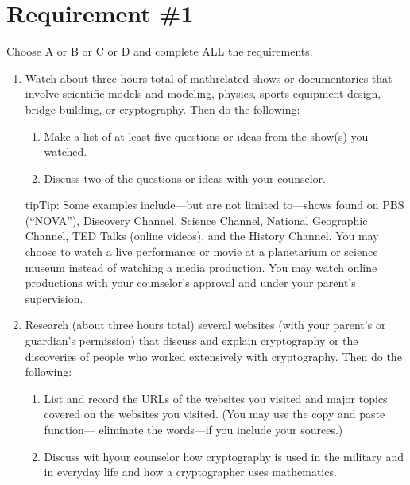 \documentclass[letterpaper,10pt,english]{sphinxmanual}
\begin{document}
\chapter{Requirement \#1}
\label{\detokenize{requirement1:requirement-1}}\label{\detokenize{requirement1::doc}}
Choose A or B or C or D and complete ALL the requirements.
\begin{enumerate}
%
\item {} 
Watch about three hours total of math\sphinxhyphen{}related shows or documentaries that involve scientific models and modeling, physics, sports equipment design, bridge building, or cryptography. Then do the following:
\begin{enumerate}
%
\item {} 
Make a list of at least five questions or ideas from the show(s) you watched.

\item {} 
Discuss two of the questions or ideas with your counselor.

\end{enumerate}

\begin{sphinxadmonition}{tip}{Tip:}
Some examples include—but are not limited to—shows found on PBS (“NOVA”), Discovery Channel, Science Channel, National Geographic Channel, TED Talks (online videos), and the History Channel. You may choose to watch a live performance or movie at a planetarium or science museum instead of watching a media production. You may watch online productions with your counselor’s approval and under your parent’s supervision.
\end{sphinxadmonition}

\item {} 
Research (about three hours total) several websites (with your parent’s or guardian’s permission) that discuss and explain cryptography or the discoveries of people who worked extensively with cryptography. Then do the following:
\begin{enumerate}
%
\item {} 
List and record the URLs of the websites you visited and major topics covered on the websites you visited. (You may use the copy and paste function— eliminate the words—if you include your sources.)

\item {} 
Discuss wit hyour counselor how cryptography is used in the military and in everyday life and how a cryptographer uses mathematics.


\end{enumerate}
\end{enumerate}
\end{document}
